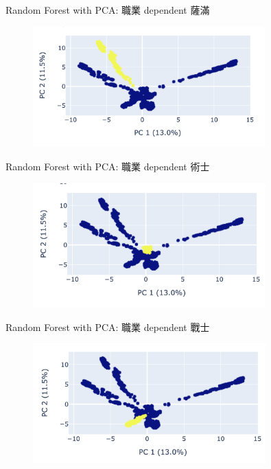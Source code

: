 \documentclass[12pt]{beamer}
\begin{document}
\begin{frame}[fragile]{Random Forest with PCA: 職業 dependent 薩滿}
	\begin{figure}
		\begin{center}
			\includegraphics[width=0.8\textwidth]{figure/plot/2_shaman.png}
		\end{center}
	\end{figure}
\end{frame}
\begin{frame}[fragile]{Random Forest with PCA: 職業 dependent 術士}
	\begin{figure}
		\begin{center}
			\includegraphics[width=0.8\textwidth]{figure/plot/2_warlock.png}
		\end{center}
	\end{figure}
\end{frame}
\begin{frame}[fragile]{Random Forest with PCA: 職業 dependent 戰士}
	\begin{figure}
		\begin{center}
			\includegraphics[width=0.8\textwidth]{figure/plot/2_warriro.png}
		\end{center}
	\end{figure}
\end{frame}
\end{document}
